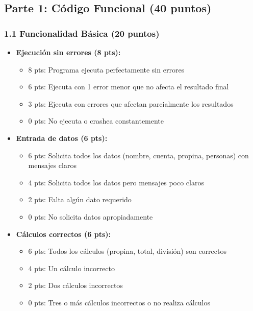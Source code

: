 \documentclass[12pt,a4paper]{article}
\begin{document}
\subsection{Parte 1: Código Funcional (40 puntos)}

\subsubsection{1.1 Funcionalidad Básica (20 puntos)}

\begin{itemize}[leftmargin=*]
    \item \textbf{Ejecución sin errores (8 pts):}
    \begin{itemize}
        \item 8 pts: Programa ejecuta perfectamente sin errores
        \item 6 pts: Ejecuta con 1 error menor que no afecta el resultado final
        \item 3 pts: Ejecuta con errores que afectan parcialmente los resultados
        \item 0 pts: No ejecuta o crashea constantemente
    \end{itemize}
    
    \item \textbf{Entrada de datos (6 pts):}
    \begin{itemize}
        \item 6 pts: Solicita todos los datos (nombre, cuenta, propina, personas) con mensajes claros
        \item 4 pts: Solicita todos los datos pero mensajes poco claros
        \item 2 pts: Falta algún dato requerido
        \item 0 pts: No solicita datos apropiadamente
    \end{itemize}
    
    \item \textbf{Cálculos correctos (6 pts):}
    \begin{itemize}
        \item 6 pts: Todos los cálculos (propina, total, división) son correctos
        \item 4 pts: Un cálculo incorrecto
        \item 2 pts: Dos cálculos incorrectos
        \item 0 pts: Tres o más cálculos incorrectos o no realiza cálculos
    \end{itemize}
\end{itemize}
\end{document}
